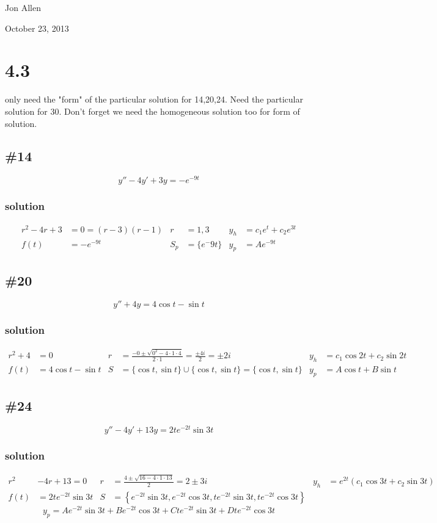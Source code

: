 \documentclass{article}
\begin{document}
Jon Allen

October 23, 2013

\section*{4.3}
only need the "form" of the particular solution for 14,20,24. Need the particular solution for 30. Don't forget we need the homogeneous solution too for form of solution.

\subsection*{\#14}
\[y''-4y'+3y=-e^{-9t}\]
\subsubsection*{solution}
\begin{align*}
	r^2-4r+3&=0=(r-3)(r-1) & r&=1,3 & y_h&=c_1e^{t}+c_2e^{3t}\\
	f(t)&=-e^{-9t} & S_p&=\{e^-9t\} & y_p&=Ae^{-9t}
\end{align*}

\subsection*{\#20}
\[y''+4y=4\cos t-\sin t\]
\subsubsection*{solution}
\begin{align*}
	r^2+4&=0 & r&=\frac{-0\pm\sqrt{0^2-4\cdot1\cdot4}}{2\cdot1}=\frac{\pm4i}{2}=\pm2i & y_h&=c_1\cos 2t+c_2\sin 2t \\
	f(t)&=4\cos t-\sin t & S&=\{\cos t,\sin t\}\cup\{\cos t,\sin t\}=\{\cos t,\sin t\} & y_p&=A\cos t+B\sin t
\end{align*}

\subsection*{\#24}
\[y''-4y'+13y=2te^{-2t}\sin 3t\]
\subsubsection*{solution}
\begin{align*}
	r^2&-4r+13=0 & r&=\frac{4\pm\sqrt{16-4\cdot1\cdot13}}{2}=2\pm3i & y_h&=e^{2t}\left(c_1\cos 3t+c_2\sin 3t\right)\\
	f(t)&=2te^{-2t}\sin 3t & S&=\left\{e^{-2t}\sin 3t,e^{-2t}\cos 3t,te^{-2t}\sin 3t,te^{-2t}\cos 3t\right\}
\end{align*}
\[y_p=Ae^{-2t}\sin 3t+Be^{-2t}\cos 3t+Cte^{-2t}\sin 3t+Dte^{-2t}\cos 3t\]
\end{document}
